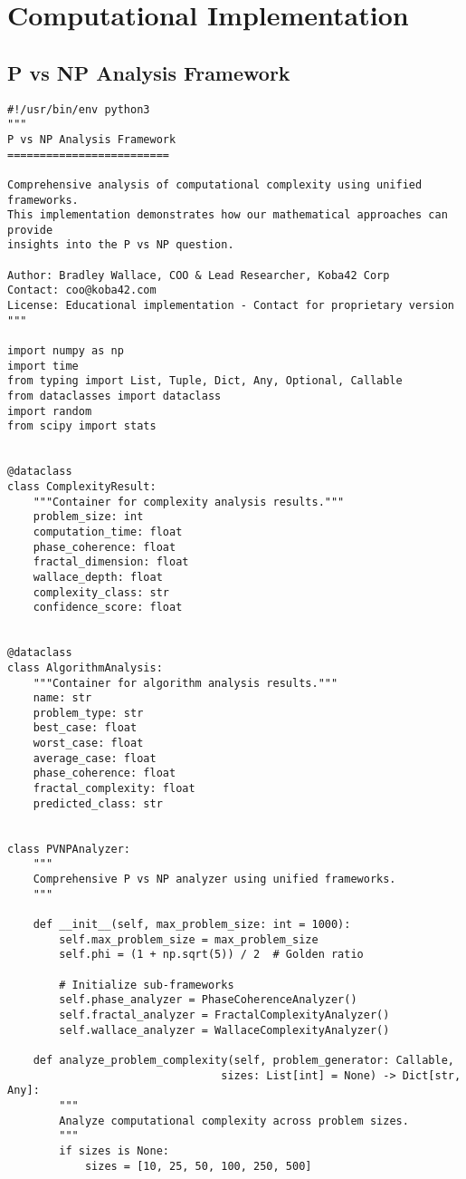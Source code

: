 \documentclass[12pt]{article}
\begin{document}
\section{Computational Implementation}

\subsection{P vs NP Analysis Framework}

\begin{lstlisting}
#!/usr/bin/env python3
"""
P vs NP Analysis Framework
=========================

Comprehensive analysis of computational complexity using unified frameworks.
This implementation demonstrates how our mathematical approaches can provide
insights into the P vs NP question.

Author: Bradley Wallace, COO & Lead Researcher, Koba42 Corp
Contact: coo@koba42.com
License: Educational implementation - Contact for proprietary version
"""

import numpy as np
import time
from typing import List, Tuple, Dict, Any, Optional, Callable
from dataclasses import dataclass
import random
from scipy import stats


@dataclass
class ComplexityResult:
    """Container for complexity analysis results."""
    problem_size: int
    computation_time: float
    phase_coherence: float
    fractal_dimension: float
    wallace_depth: float
    complexity_class: str
    confidence_score: float


@dataclass
class AlgorithmAnalysis:
    """Container for algorithm analysis results."""
    name: str
    problem_type: str
    best_case: float
    worst_case: float
    average_case: float
    phase_coherence: float
    fractal_complexity: float
    predicted_class: str


class PVNPAnalyzer:
    """
    Comprehensive P vs NP analyzer using unified frameworks.
    """

    def __init__(self, max_problem_size: int = 1000):
        self.max_problem_size = max_problem_size
        self.phi = (1 + np.sqrt(5)) / 2  # Golden ratio

        # Initialize sub-frameworks
        self.phase_analyzer = PhaseCoherenceAnalyzer()
        self.fractal_analyzer = FractalComplexityAnalyzer()
        self.wallace_analyzer = WallaceComplexityAnalyzer()

    def analyze_problem_complexity(self, problem_generator: Callable,
                                 sizes: List[int] = None) -> Dict[str, Any]:
        """
        Analyze computational complexity across problem sizes.
        """
        if sizes is None:
            sizes = [10, 25, 50, 100, 250, 500]


\end{lstlisting}
\end{document}
